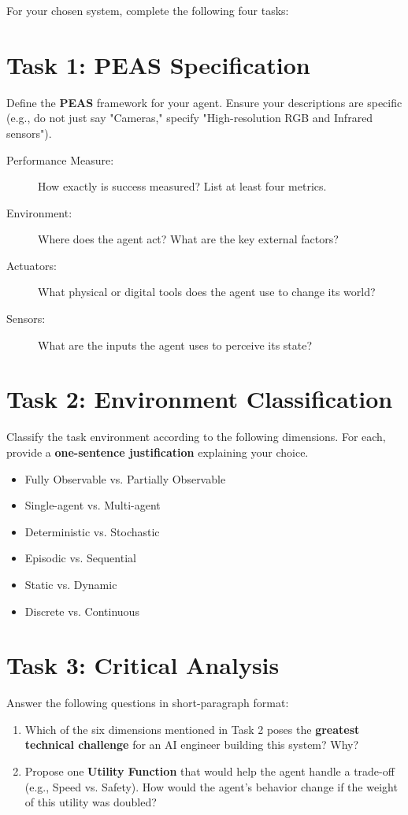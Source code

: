 \documentclass[11pt]{article}
\begin{document}
\vspace{0.3cm}
\noindent For your chosen system, complete the following four tasks:

\section{Task 1: PEAS Specification}
Define the \textbf{PEAS} framework for your agent. Ensure your descriptions are specific (e.g., do not just say "Cameras," specify "High-resolution RGB and Infrared sensors").

\begin{description}
    \item[Performance Measure:] How exactly is success measured? List at least four metrics.
    \item[Environment:] Where does the agent act? What are the key external factors?
    \item[Actuators:] What physical or digital tools does the agent use to change its world?
    \item[Sensors:] What are the inputs the agent uses to perceive its state?
\end{description}

\section{Task 2: Environment Classification}
Classify the task environment according to the following dimensions. For each, provide a \textbf{one-sentence justification} explaining your choice.
\begin{itemize}
    \item Fully Observable vs. Partially Observable
    \item Single-agent vs. Multi-agent
    \item Deterministic vs. Stochastic
    \item Episodic vs. Sequential
    \item Static vs. Dynamic
    \item Discrete vs. Continuous
\end{itemize}

\section{Task 3: Critical Analysis}
Answer the following questions in short-paragraph format:
\begin{enumerate}
    \item Which of the six dimensions mentioned in Task 2 poses the \textbf{greatest technical challenge} for an AI engineer building this system? Why?
    \item Propose one \textbf{Utility Function} that would help the agent handle a trade-off (e.g., Speed vs. Safety). How would the agent's behavior change if the weight of this utility was doubled?
\end{enumerate}
\end{document}
